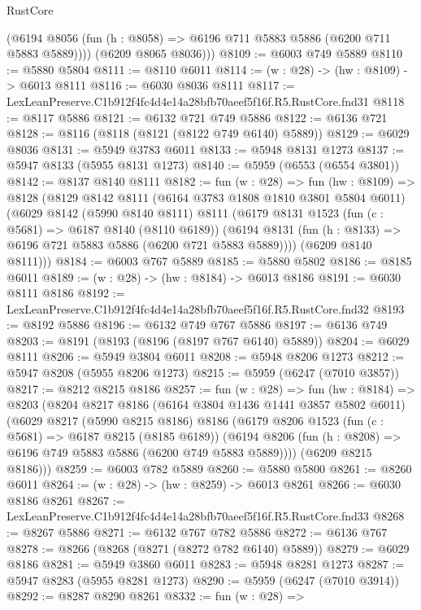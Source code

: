 \begin{lexlean}{RustCore}
\begin{coremodule}
          (@6194 @8056 (fun (h : @8058) => @6196 @711 @5883 @5886 (@6200 @711 @5883 @5889))))
        (@6209 @8065 @8036)))
@8109 := @6003 @749 @5889
@8110 := @5880 @5804
@8111 := @8110 @6011
@8114 := (w : @28) -> (hw : @8109) -> @6013 @8111
@8116 := @6030 @8036 @8111
@8117 := LexLeanPreserve.C1b912f4fc4d4e14a28bfb70aeef5f16f.R5.RustCore.fnd31
@8118 := @8117 @5886
@8121 := @6132 @721 @749 @5886
@8122 := @6136 @721
@8128 := @8116 (@8118 (@8121 (@8122 @749 @6140) @5889))
@8129 := @6029 @8036
@8131 := @5949 @3783 @6011
@8133 := @5948 @8131 @1273
@8137 := @5947 @8133 (@5955 @8131 @1273)
@8140 := @5959 (@6553 (@6554 @3801))
@8142 := @8137 @8140 @8111
@8182 := fun (w : @28) =>
  fun (hw : @8109) =>
  @8128
    (@8129
      @8142
      @8111
      (@6164 @3783 @1808 @1810 @3801 @5804 @6011)
      (@6029
        @8142
        (@5990 @8140 @8111)
        @8111
        (@6179
          @8131
          @1523
          (fun (c : @5681) => @6187 @8140 (@8110 @6189))
          (@6194 @8131 (fun (h : @8133) => @6196 @721 @5883 @5886 (@6200 @721 @5883 @5889))))
        (@6209 @8140 @8111)))
@8184 := @6003 @767 @5889
@8185 := @5880 @5802
@8186 := @8185 @6011
@8189 := (w : @28) -> (hw : @8184) -> @6013 @8186
@8191 := @6030 @8111 @8186
@8192 := LexLeanPreserve.C1b912f4fc4d4e14a28bfb70aeef5f16f.R5.RustCore.fnd32
@8193 := @8192 @5886
@8196 := @6132 @749 @767 @5886
@8197 := @6136 @749
@8203 := @8191 (@8193 (@8196 (@8197 @767 @6140) @5889))
@8204 := @6029 @8111
@8206 := @5949 @3804 @6011
@8208 := @5948 @8206 @1273
@8212 := @5947 @8208 (@5955 @8206 @1273)
@8215 := @5959 (@6247 (@7010 @3857))
@8217 := @8212 @8215 @8186
@8257 := fun (w : @28) =>
  fun (hw : @8184) =>
  @8203
    (@8204
      @8217
      @8186
      (@6164 @3804 @1436 @1441 @3857 @5802 @6011)
      (@6029
        @8217
        (@5990 @8215 @8186)
        @8186
        (@6179
          @8206
          @1523
          (fun (c : @5681) => @6187 @8215 (@8185 @6189))
          (@6194 @8206 (fun (h : @8208) => @6196 @749 @5883 @5886 (@6200 @749 @5883 @5889))))
        (@6209 @8215 @8186)))
@8259 := @6003 @782 @5889
@8260 := @5880 @5800
@8261 := @8260 @6011
@8264 := (w : @28) -> (hw : @8259) -> @6013 @8261
@8266 := @6030 @8186 @8261
@8267 := LexLeanPreserve.C1b912f4fc4d4e14a28bfb70aeef5f16f.R5.RustCore.fnd33
@8268 := @8267 @5886
@8271 := @6132 @767 @782 @5886
@8272 := @6136 @767
@8278 := @8266 (@8268 (@8271 (@8272 @782 @6140) @5889))
@8279 := @6029 @8186
@8281 := @5949 @3860 @6011
@8283 := @5948 @8281 @1273
@8287 := @5947 @8283 (@5955 @8281 @1273)
@8290 := @5959 (@6247 (@7010 @3914))
@8292 := @8287 @8290 @8261
@8332 := fun (w : @28) =>

\end{coremodule}
\end{lexlean}

